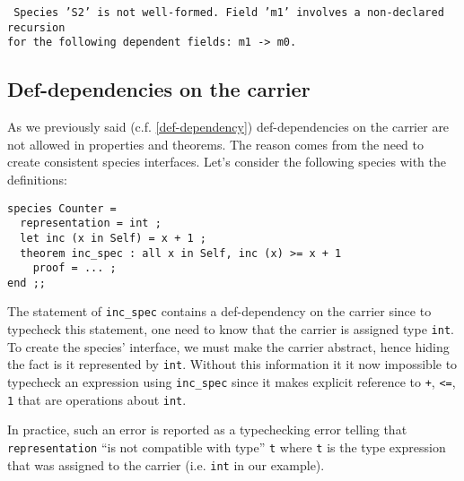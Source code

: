 \noindent
{\scriptsize
{\tt
Species 'S2' is not well-formed. Field
'm1' involves a non-declared recursion\\
for the following dependent fields: m1 -> m0.
}
}



\subsection{Def-dependencies on the carrier}
\label{def-dep-on-carrier}
As we previously said (c.f. \ref{def-dependency}) def-dependencies on
the carrier are not allowed in properties and theorems. The reason
comes from the need to create consistent species interfaces. Let's
consider the following species with the definitions:
{\scriptsize
\begin{lstlisting}
species Counter =
  representation = int ;
  let inc (x in Self) = x + 1 ;
  theorem inc_spec : all x in Self, inc (x) >= x + 1
    proof = ... ;
end ;;
\end{lstlisting}
}

The statement of {\tt inc\_spec} contains a def-dependency on the
carrier since to typecheck this statement, one need to know that the
carrier is assigned type {\tt int}. To create the species' interface,
we must make the carrier abstract, hence hiding the fact is it
represented by {\tt int}. Without this information it it now
impossible to typecheck an expression using {\tt inc\_spec} since it
makes explicit reference to {\tt +}, {\tt <=}, {\tt 1} that are
operations about {\tt int}.

In practice, such an error is reported as a typechecking error telling
that {\tt representation} ``is not compatible with type'' {\tt t} where {\tt t}
is the type expression that was assigned to the carrier (i.e.
{\tt int} in 
our example).
